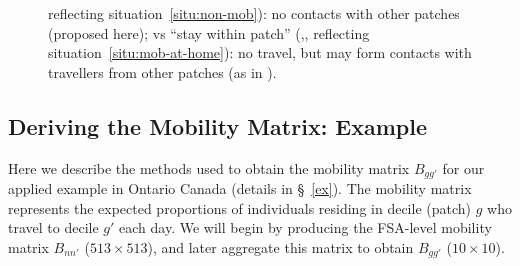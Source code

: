 \begin{figure}[ht]
{    reflecting situation~\ref{situ:non-mob}):
    no contacts with other patches (proposed here); vs
    ``stay within patch'' (,,
    reflecting situation~\ref{situ:mob-at-home}):
    no travel, but may form contacts with travellers from other patches (as in \cite{Arenas2020}).}
  \label{fig:nm}
\end{figure}
\clearpage
\subsection{Deriving the Mobility Matrix: Example}\label{app.mob}
Here we describe the methods used to obtain the mobility matrix $B_{gg'}$
for our applied example in Ontario Canada (details in \S~\ref{ex}).
The mobility matrix represents
the expected proportions of individuals residing in decile (patch) $g$ who travel to decile $g'$ each day.
We will begin by producing the FSA-level mobility matrix $B_{nn'}$ ($513 \times 513$),
and later aggregate this matrix to obtain $B_{gg'}$ ($10 \times 10$).
